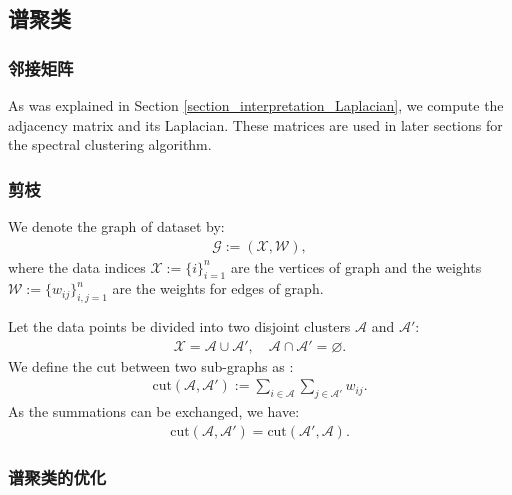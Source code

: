 \documentclass[lang=cn,10pt]{gorgeousnbook}
\numberwithin{equation}{section}%
\numberwithin{figure}{section}%
\begin{document}
\subsection{谱聚类}

\subsubsection{邻接矩阵}

As was explained in Section \ref{section_interpretation_Laplacian}, we compute the adjacency matrix and its Laplacian. These matrices are used in later sections for the spectral clustering algorithm. 

\subsubsection{剪枝}

We denote the graph of dataset by:
\begin{align}
\mathcal{G} := (\mathcal{X}, \mathcal{W}),
\end{align}
where the data indices $\mathcal{X} := \{i\}_{i=1}^n$ are the vertices of graph and the weights $\mathcal{W} := \{w_{ij}\}_{i,j=1}^n$ are the weights for edges of graph. 

Let the data points be divided into two disjoint clusters $\mathcal{A}$ and $\mathcal{A}'$:
\begin{align}
\mathcal{X} = \mathcal{A} \cup \mathcal{A}', \quad \mathcal{A} \cap \mathcal{A}' = \varnothing.
\end{align}
We define the cut between two sub-graphs as \cite{shi1997normalized,shi2000normalized}:
\begin{align}\label{equation_cut}
\text{cut}(\mathcal{A}, \mathcal{A}') := \sum_{i \in \mathcal{A}} \sum_{j \in \mathcal{A}'} w_{ij}.
\end{align}
As the summations can be exchanged, we have:
\begin{align}\label{equation_cut_symmetry}
\text{cut}(\mathcal{A}, \mathcal{A}') = \text{cut}(\mathcal{A}', \mathcal{A}).
\end{align}

\subsubsection{谱聚类的优化}
\end{document}
